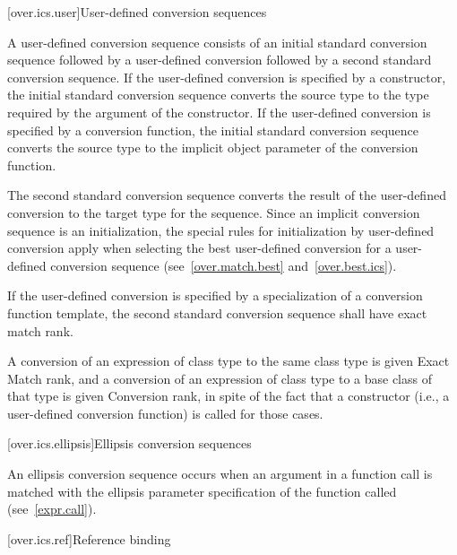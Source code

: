 [over.ics.user]{User-defined conversion sequences}

\pnum
A user-defined conversion sequence consists of an initial
standard conversion sequence followed by a user-defined
conversion followed by a second standard
conversion sequence.
If the user-defined conversion is specified
by a constructor, the initial standard
conversion sequence converts the source type to the type required
by the argument of the constructor.
If the user-defined
conversion is specified by a conversion function, the
initial standard conversion sequence
converts the source type to the implicit object parameter of the
conversion function.

\pnum
The second standard conversion sequence converts the result of
the user-defined conversion to the target type for the sequence.
Since an implicit conversion sequence is an initialization, the
special rules for initialization by user-defined conversion apply
when selecting the best user-defined conversion for a
user-defined conversion sequence (see~\ref{over.match.best} and~\ref{over.best.ics}).

\pnum
If the user-defined conversion is specified by a
specialization of a conversion function template,
the second standard conversion sequence shall have exact match rank.

\pnum
A conversion of an expression of class type
to the same class type is given Exact Match rank, and
a conversion of an expression of class type
to a base class of that type is given Conversion rank,
in spite of the
fact that a constructor (i.e., a user-defined conversion
function) is called for those cases.

[over.ics.ellipsis]{Ellipsis conversion sequences}

\pnum
{}%
An ellipsis conversion sequence occurs when an argument in a
function call is matched with the ellipsis parameter
specification of the function called (see~\ref{expr.call}).

[over.ics.ref]{Reference binding}

